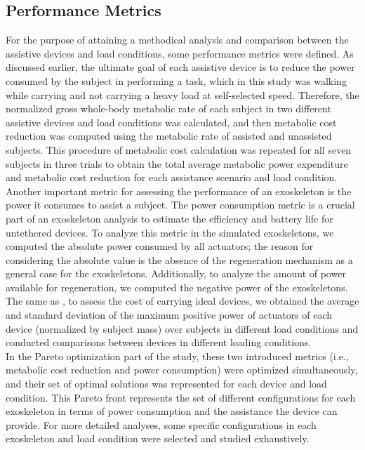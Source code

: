 \documentclass[10pt,letterpaper]{article}
\begin{document}
\subsection*{Performance Metrics}
For the purpose of attaining a methodical analysis and comparison between the assistive devices and load conditions, some performance metrics were defined. As discussed earlier, the ultimate goal of each assistive device is to reduce the power consumed by the subject in performing a task, which in this study was walking while carrying and not carrying a heavy load at self-selected speed.
Therefore, the normalized gross whole-body metabolic rate of each subject in two different assistive devices and load conditions was calculated, and then metabolic cost reduction was computed using the metabolic rate of assisted and unassisted subjects. This procedure of metabolic cost calculation was repeated for all seven subjects in three trials to obtain the total average metabolic power expenditure and metabolic cost reduction for each assistance scenario and load condition.\\
Another important metric for assessing the performance of an exoskeleton is the power it consumes to assist a subject. The power consumption metric is a crucial part of an exoskeleton analysis to estimate the efficiency and battery life for untethered devices. To analyze this metric in the simulated exoskeletons, we computed the absolute power consumed by all actuators; the reason for considering the absolute value is the absence of the regeneration mechanism as a general case for the exoskeletons. Additionally, to analyze the amount of power available for regeneration, we computed the negative power of the exoskeletons. The same as \cite{93}, to assess the cost of carrying ideal devices, we obtained the average and standard deviation of the maximum positive power of actuators of each device (normalized by subject mass) over subjects in different load conditions and conducted comparisons between devices in different loading conditions.\\
In the Pareto optimization part of the study, these two introduced metrics (i.e., metabolic cost reduction and power consumption) were optimized simultaneously, and their set of optimal solutions was represented for each device and load condition. This Pareto front represents the set of different configurations for each exoskeleton in terms of power consumption and the assistance the device can provide. For more detailed analyses, some specific configurations in each exoskeleton and load condition were selected and studied exhaustively.\\
\end{document}
